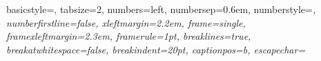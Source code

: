 
{
	basicstyle=\ttfamily\footnotesize,
	tabsize=2,
	numbers=left,
	numbersep=0.6em,			%
	numberstyle=\footnotesize\ttfamily\itshape,
	numberfirstline=false,
	xleftmargin=2.2em,		%
	frame=single,			%
	framexleftmargin=2.3em,	%
	framerule=1pt,
	breaklines=true,
	breakatwhitespace=false,
	breakindent=20pt,
	captionpos=b,
	escapechar=~
}

{
	\fancyhf{}	%
	\fancyhead[LE,RO] {\thepage}
	\renewcommand {\headrulewidth}{0pt}
	\renewcommand {\footrulewidth}{0pt}
}